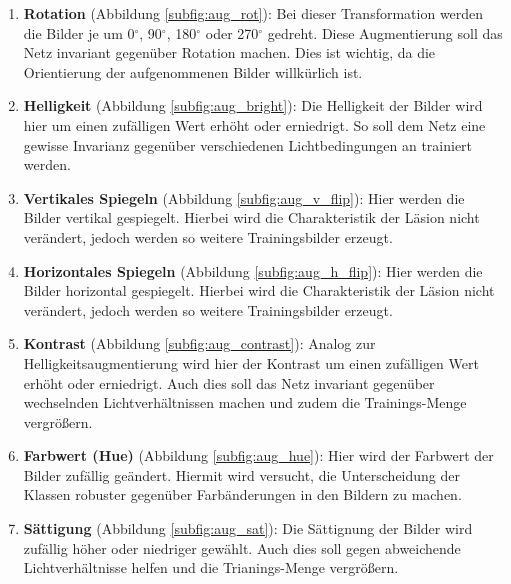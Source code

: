 \begin{enumerate}
    \item \textbf{Rotation} (Abbildung \ref{subfig:aug_rot}): Bei dieser Transformation werden die Bilder je um 0$^{\circ}$, 90$^{\circ}$, 180$^{\circ}$ oder 270$^{\circ}$ gedreht. Diese Augmentierung soll das Netz invariant gegenüber Rotation machen. Dies ist wichtig, da die Orientierung der aufgenommenen Bilder willkürlich ist.
    
    \item \textbf{Helligkeit} (Abbildung \ref{subfig:aug_bright}):  Die Helligkeit der Bilder wird hier um einen zufälligen Wert erhöht oder erniedrigt. So soll dem Netz eine gewisse Invarianz gegenüber verschiedenen Lichtbedingungen an trainiert werden.
    
    \item \textbf{Vertikales Spiegeln} (Abbildung \ref{subfig:aug_v_flip}): Hier werden die Bilder vertikal gespiegelt. Hierbei wird die Charakteristik der Läsion nicht verändert, jedoch werden so weitere Trainingsbilder erzeugt. 
    
    \item \textbf{Horizontales Spiegeln} (Abbildung \ref{subfig:aug_h_flip}):  Hier werden die Bilder horizontal gespiegelt. Hierbei wird die Charakteristik der Läsion nicht verändert, jedoch werden so weitere Trainingsbilder erzeugt.
    
    \item \textbf{Kontrast} (Abbildung \ref{subfig:aug_contrast}):  Analog zur Helligkeitsaugmentierung wird hier der Kontrast um einen zufälligen Wert erhöht oder erniedrigt. Auch dies soll das Netz invariant gegenüber wechselnden Lichtverhältnissen machen und zudem die Trainings-Menge vergrößern.
    
    \item \textbf{Farbwert (Hue)} (Abbildung \ref{subfig:aug_hue}):  Hier wird der Farbwert der Bilder zufällig geändert. Hiermit wird versucht, die Unterscheidung der Klassen robuster gegenüber Farbänderungen in den Bildern zu machen.
    
    \item \textbf{Sättigung} (Abbildung \ref{subfig:aug_sat}):  Die Sättignung der Bilder wird zufällig höher oder niedriger gewählt. Auch dies soll gegen abweichende Lichtverhältnisse helfen und die Trianings-Menge vergrößern.
\end{enumerate}


